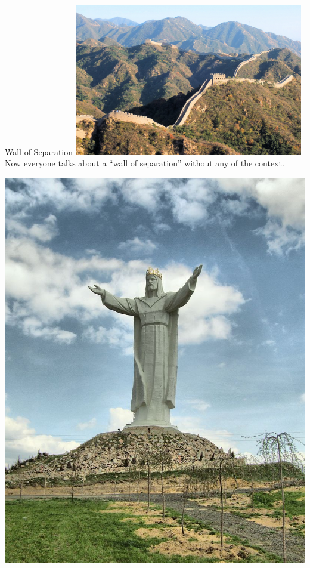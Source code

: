 \begin{frame}{Wall of Separation}
    \centering
    \includegraphics[width=0.75\textwidth]{img/great-wall.jpg} \\
    Now everyone talks about a ``wall of separation'' without any of the context.
\end{frame}

\begin{frame}
    \centering
    \includegraphics[height=0.95\textheight]{img/christ-statue.jpg} \\
\end{frame}

